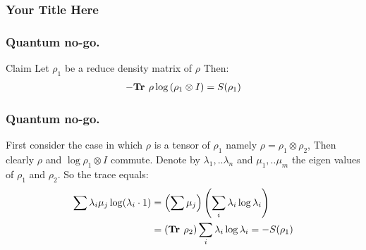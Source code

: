 \documentclass{beamer}
\begin{document}
\begin{frame}
  \frametitle{Your Title Here}
\end{frame}
\begin{frame}
  \frametitle{Quantum no-go.}
  
\begin{block}{Claim}
  Let $\rho_{1}$ be a reduce density matrix of $\rho$ Then:  
  \begin{equation*}
    \begin{split}
      - \textbf{Tr } \rho \log \left( \rho_{1} \otimes I \right)= S(\rho_{1})
    \end{split}
  \end{equation*}
\end{block}
\end{frame}
\begin{frame}
  \frametitle{Quantum no-go.}
  First consider the case in which $\rho$ is a tensor of $\rho_{1}$ namely $\rho = \rho_{1} \otimes \rho_{2}$, Then clearly $\rho$ and $\log \rho_{1} \otimes I$ commute. 
  Denote by $\lambda_{1},..\lambda_{n}$ and $\mu_{1},..\mu_{m}$ the eigen values of $\rho_{1}$ and $\rho_2$. So the trace equals: 
  \begin{equation*}
    \begin{split}
      \sum \lambda_{i}\mu_{j}\log(\lambda_{i} \cdot 1) &= \left( \sum \mu_{j} \right) \left( \sum_i \lambda_{i} \log \lambda_{i} \right) \\
      &= \left( \textbf{Tr } \rho_{2} \right) \sum_i \lambda_{i} \log \lambda_{i} = -S(\rho_{1})
    \end{split}
  \end{equation*}
\end{frame}
\end{document}
